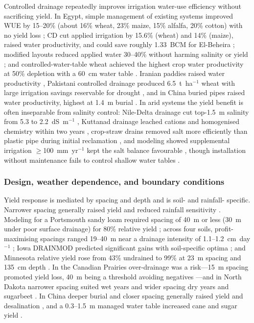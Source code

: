 Controlled drainage repeatedly improves irrigation water-use efficiency without
sacrificing yield. In Egypt, simple management of existing systems improved WUE by
15--20\% (about 16\% wheat, 23\% maize, 15\% alfalfa, 20\% cotton) with no yield
loss \parencite{Wahba2005}; CD cut applied irrigation by 15.6\% (wheat) and 14\%
(maize), raised water productivity, and could save roughly 1.33~BCM for
El-Beheira \parencite{Mahmoud2021}; modified layouts reduced applied water 30--40\%
without harming salinity or yield \parencite{ELATFY1991}; and controlled-water-table
wheat achieved the highest crop water productivity at 50\% depletion with a 60~cm
water table \parencite{ElHassanin2022}. Iranian paddies raised water productivity
\parencite{DarziNaftchali2017b,Asgari2021}, Pakistani controlled drainage produced
6.5~t~ha$^{-1}$ wheat with large irrigation savings reservable for drought
\parencite{Khan2003,Sarwar2001}, and in China buried pipes raised water
productivity, highest at 1.4~m burial \parencite{Liu2025}. In arid systems the
yield benefit is often inseparable from salinity control: Nile-Delta drainage cut
top-1.5~m salinity from 5.3 to 2.2~dS~m$^{-1}$ \parencite{ELMOWELHI1988},
Kuttanad drainage leached cations and homogenised chemistry within two years
\parencite{Mathew2001}, crop-straw drains removed salt more efficiently than
plastic pipe during initial reclamation \parencite{Lu2018}, and modeling showed
supplemental irrigation $\geq$100~mm~yr$^{-1}$ kept the salt balance favourable
\parencite{Li2018,Sarwar2001,Zhang2024c,Yang2022,Liu2025,Guo2025}, though
installation without maintenance fails to control shallow water tables
\parencite{Malota2016}.

\subsubsection{Design, weather dependence, and boundary conditions}

Yield response is mediated by spacing and depth and is soil- and rainfall-
specific. Narrower spacing generally raised yield and reduced rainfall sensitivity
\parencite{Rui2024,Kladivko2005,Nelson2017}. Modeling for a Portsmouth sandy loam
required spacing of 40~m or less (30~m under poor surface drainage) for 80\%
relative yield \parencite{HARDJOAMIDJOJO1982}; across four soils, profit-maximising
spacings ranged 19--40~m near a drainage intensity of 1.1--1.2~cm~day$^{-1}$
\parencite{Skaggs2006}; Iowa DRAINMOD predicted significant gains with
soil-specific optima \parencite{Arora2024}; and Minnesota relative yield rose from
43\% undrained to 99\% at 23~m spacing and 135~cm depth \parencite{Sands2015}. In
the Canadian Prairies over-drainage was a risk---15~m spacing promoted yield loss,
40~m being a threshold avoiding negatives \parencite{Cordeiro2015}---and in North
Dakota narrower spacing suited wet years and wider spacing dry years and sugarbeet
\parencite{Acharya2019}. In China deeper burial and closer spacing generally
raised yield and desalination \parencite{Liu2025,Yang2022,Guo2025,Hou2018}, and a
0.3--1.5~m managed water table increased cane and sugar yield \parencite{CAMP1982}.

